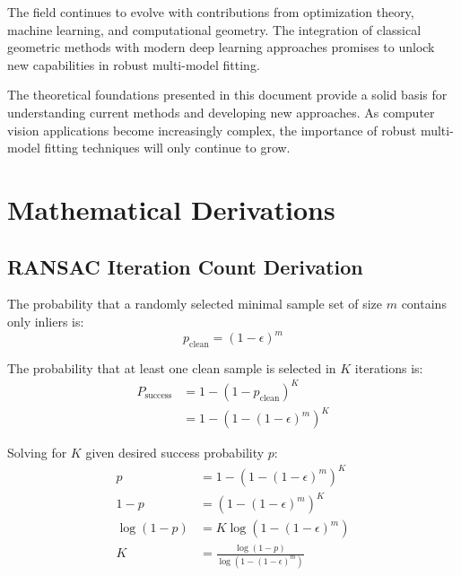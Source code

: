 \documentclass[12pt]{article}
\begin{document}
The field continues to evolve with contributions from optimization theory, machine learning, and computational geometry. The integration of classical geometric methods with modern deep learning approaches promises to unlock new capabilities in robust multi-model fitting.


The theoretical foundations presented in this document provide a solid basis for understanding current methods and developing new approaches. As computer vision applications become increasingly complex, the importance of robust multi-model fitting techniques will only continue to grow.

\newpage

\appendix

\section{Mathematical Derivations}
\label{app:derivations}

\subsection{RANSAC Iteration Count Derivation}
\label{app:ransac_iterations}

The probability that a randomly selected minimal sample set of size $m$ contains only inliers is:
\begin{equation}
    p_{\text{clean}} = (1 - \epsilon)^m
    \label{eq:prob_clean_sample}
\end{equation}

The probability that at least one clean sample is selected in $K$ iterations is:
\begin{align}
    P_{\text{success}} & = 1 - (1 - p_{\text{clean}})^K \\
                       & = 1 - (1 - (1-\epsilon)^m)^K
    \label{eq:success_probability}
\end{align}

Solving for $K$ given desired success probability $p$:
\begin{align}
    p           & = 1 - (1 - (1-\epsilon)^m)^K                   \\
    1 - p       & = (1 - (1-\epsilon)^m)^K                       \\
    \log(1 - p) & = K \log(1 - (1-\epsilon)^m)                   \\
    K           & = \frac{\log(1 - p)}{\log(1 - (1-\epsilon)^m)}
    \label{eq:ransac_iterations_derivation}
\end{align}
\end{document}
